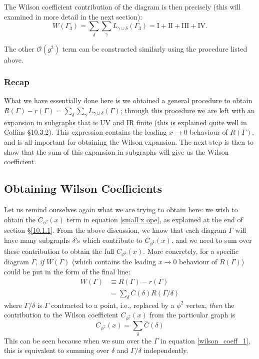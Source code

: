 \documentclass{article}
\begin{document}
The Wilson coefficient contribution of the diagram is then precisely (this will examined in more detail in the next section):
\begin{equation}
    W(\Gamma_3) = \sum_\delta \sum_\gamma L_{\gamma \cup \delta} (\Gamma_3) = \text{I} + \text{II} + \text{III} + \text{IV}.
\end{equation}

The other $\mathcal{O}(g^2)$ term can be constructed similarly using the procedure listed above.

\subsubsection{Recap}
What we have essentially done here is we obtained a general procedure to obtain $R(\Gamma) - r(\Gamma) = \sum_\delta \sum_\gamma L_{\gamma \cup \delta}(\Gamma)$; through this procedure we are left with an expansion in subgraphs that is UV and IR finite (this is explained quite well in Collins \S 10.3.2). This expression contains the leading $x \rightarrow 0$ behaviour of $R(\Gamma)$, and is all-important for obtaining the Wilson expansion. The next step is then to show that the sum of this expansion in subgraphs will give us the Wilson coefficient.

\subsection{Obtaining Wilson Coefficients}
Let us remind ourselves again what we are trying to obtain here: we wish to obtain the $C_{\phi^2}(x)$ term in equation \ref{small x ope}, as explained at the end of section \S\ref{10.1.1}. From the above discussion, we know that each diagram $\Gamma$ will have many subgraphs $\delta$'s which contribute to $C_{\phi^2}(x)$, and we need to sum over these contribution to obtain the full $C_{\phi^2}(x)$. More concretely, for a specific diagram $\Gamma$, \textit{if} $W(\Gamma)$ (which contains the leading $x \rightarrow 0$ behaviour of $R(\Gamma)$) could be put in the form of the final line:
\begin{equation}
\begin{split}
\label{wilson_coeff_1}
    W(\Gamma) &\equiv R(\Gamma) - r(\Gamma)\\ 
    &= \sum_\delta \bar{C}(\delta) R(\Gamma/\delta)
\end{split}
\end{equation}
where $\Gamma/\delta$ is $\Gamma$ contracted to a point, i.e., replaced by a $\phi^2$ vertex, \textit{then} the contribution to the Wilson coefficient $C_{\phi^2}(x)$ from the particular graph is
\begin{equation}
    C_{\phi^2}(x) = \sum_\delta \bar{C}(\delta)
\end{equation}
This can be seen because when we sum over the $\Gamma$ in equation \ref{wilson_coeff_1}, this is equivalent to summing over $\delta$ and $\Gamma/\delta$ independently.
\end{document}
